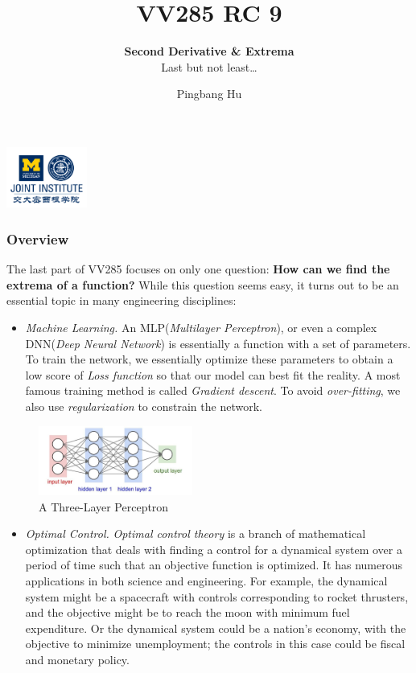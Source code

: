\documentclass[10pt, t, allowdisplaybreaks]{beamer}
\title{VV285 RC 9}
\subtitle{\textbf{Second Derivative \& Extrema}\\\large Last but not least\dots}
\institute[UM-SJTU JI]{University of Michigan-Shanghai Jiao Tong University Joint Institute}
\author{Pingbang Hu}
\renewcommand{\emph}[1]{{\color{Turquoise3}\textsl{#1}}}
\begin{document}
\begin{frame}
    \titlepage
    \begin{center}
        \includegraphics[height=2cm]{Figures/logo/logo2.png}
    \end{center}
\end{frame}

\begin{frame}[allowframebreaks]
    \frametitle{Overview}
    The last part of VV285 focuses on only one question: \textbf{How can we find the extrema of a function?} While this question seems easy, it turns out to be an essential topic in many engineering disciplines:
    \begin{itemize}
        \item \emph{Machine Learning.} An MLP(\textit{Multilayer Perceptron}), or even a complex DNN(\textit{Deep Neural Network}) is essentially a function with a set of parameters. To train the network, we essentially optimize these parameters to obtain a low score of \textit{Loss function} so that our model can best fit the reality. A most famous training method is called \textit{Gradient descent}. To avoid \emph{over-fitting}, we also use \textit{regularization} to constrain the network.
    \end{itemize}
    \begin{figure}[H]
        \centering
        \includegraphics[width=0.45\textwidth]{Figures/2020-07-28-20-42-04.png}
        \caption{A Three-Layer Perceptron}
    \end{figure}
    \newpage
    \begin{itemize}
        \item \emph{Optimal Control.} \textit{Optimal control theory} is a branch of mathematical optimization that deals with finding a control for a dynamical system over a period of time such that an objective function is optimized. It has numerous applications in both science and engineering. For example, the dynamical system might be a spacecraft with controls corresponding to rocket thrusters, and the objective might be to reach the moon with minimum fuel expenditure. Or the dynamical system could be a nation's economy, with the objective to minimize unemployment; the controls in this case could be fiscal and monetary policy.

\end{itemize}
\end{frame}
\end{document}
